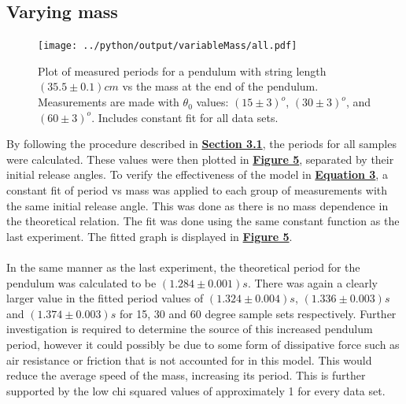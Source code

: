 \documentclass[
	letterpaper
	12pt
]{template}
\newcommand{\bref}[2]{\textbf{\hyperref[#1]{#2}}}
\begin{document}
\subsection{Varying mass}
\begin{figure}\label{plt::mass}
	\centering
	\vspace{-20pt}
		\centering
		\texttt{[image: ../python/output/variableMass/all.pdf]}
		\caption{Plot of measured periods for a pendulum with string length $(35.5\pm 0.1)\unit{cm}$ vs the mass at the end of the pendulum. Measurements are made with $\theta_0$ values: $(15\pm 3)^o$, $(30\pm 3)^o$, and $(60\pm 3)^o$. Includes constant fit for all data sets.}

		\vspace{-100pt}
\end{figure}
By following the procedure described in \bref{uncertainty}{Section 3.1}, the periods for all samples were calculated. These values were then plotted in \bref{plt::mass}{Figure 5}, separated by their initial release angles. To verify the effectiveness of the model in \bref{eqn::omegaValue}{Equation 3}, a constant fit of period vs mass was applied to each group of measurements with the same initial release angle. This was done as there is no mass dependence in the theoretical relation. The fit was done using the same constant function as the last experiment. The fitted graph is displayed in \bref{plt::angle}{Figure 5}.\\\\
In the same manner as the last experiment, the theoretical period for the pendulum was calculated to be $(1.284\pm 0.001)\unit{s}$. There was again a clearly larger value in the fitted period values of $(1.324\pm 0.004)\unit{s}$, $(1.336\pm 0.003)\unit{s}$ and $(1.374\pm 0.003)\unit{s}$ for 15, 30 and 60 degree sample sets respectively. Further investigation is required to determine the source of this increased pendulum period, however it could possibly be due to some form of dissipative force such as air resistance or friction that is not accounted for in this model. This would reduce the average speed of the mass, increasing its period. This is further supported by the low chi squared values of approximately 1 for every data set.
\end{document}
